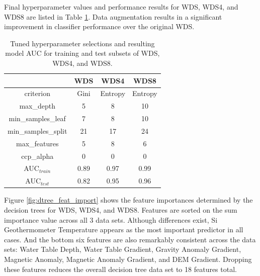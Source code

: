 Final hyperparameter values and performance results for WDS, WDS4, and WDS8 are listed in Table \ref{tab:dtree_tuning}. Data augmentation results in a significant improvement in classifier performance over the original WDS.

\begin{table}[!htp]
\centering
\begin{tabular}{c|c|c|c|}
\cline{2-4}
                                          & WDS & WDS4 & WDS8 \\ \hline
\multicolumn{1}{|c|}{criterion}           & Gini & Entropy & Entropy \\ \hline
\multicolumn{1}{|c|}{max\_depth}          & 5 & 8 & 10 \\ \hline
\multicolumn{1}{|c|}{min\_samples\_leaf}  & 7 & 8 & 10 \\ \hline
\multicolumn{1}{|c|}{min\_samples\_split} & 21 & 17 & 24 \\ \hline
\multicolumn{1}{|c|}{max\_features}       & 5 & 8 & 6 \\ \hline
\multicolumn{1}{|c|}{ccp\_alpha}          & 0  & 0 & 0 \\ \hline
\multicolumn{1}{|c|}{AUC$_{train}$}       & 0.89 & 0.97 & 0.99 \\ \hline
\multicolumn{1}{|c|}{AUC$_{test}$} & 0.82 & 0.95 & 0.96 \\ \hline
\end{tabular}
\caption[Decision tree hyperparameter values]{Tuned hyperparameter selections and resulting model AUC for training and test subsets of WDS, WDS4, and WDS8.}
\label{tab:dtree_tuning}
\end{table}

Figure \ref{fig:dtree_feat_import} shows the feature importances determined by the decision trees for WDS, WDS4, and WDS8.  Features are sorted on the sum importance value across all 3 data sets. Although differences exist, Si Geothermometer Temperature appears as the most important predictor in all cases. And the bottom six features are also remarkably consistent across the data sets: Water Table Depth, Water Table Gradient, Gravity Anomaly Gradient, Magnetic Anomaly, Magnetic Anomaly Gradient, and DEM Gradient. Dropping these features reduces the overall decision tree data set to 18 features total.

